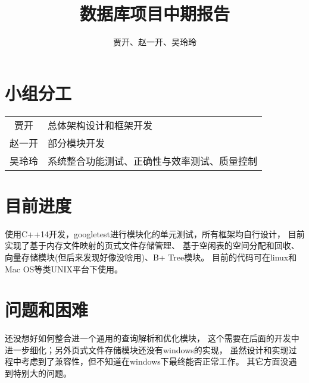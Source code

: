 \documentclass[a4paper]{article}
\title{数据库项目中期报告}
\author{贾开、赵一开、吴玲玲}
\date{}
\begin{document}
\maketitle
\section{小组分工}
\begin{tabular}{cl}
    贾开 & 总体架构设计和框架开发 \\
    赵一开 & 部分模块开发 \\
    吴玲玲 & 系统整合功能测试、正确性与效率测试、质量控制
\end{tabular}

\section{目前进度}
使用C++14开发，googletest进行模块化的单元测试，所有框架均自行设计，
目前实现了基于内存文件映射的页式文件存储管理、
基于空闲表的空间分配和回收、向量存储模块(但后来发现好像没啥用)、B+ Tree模块。
目前的代码可在linux和Mac OS等类UNIX平台下使用。

\section{问题和困难}
还没想好如何整合进一个通用的查询解析和优化模块，
这个需要在后面的开发中进一步细化；另外页式文件存储模块还没有windows的实现，
虽然设计和实现过程中考虑到了兼容性，但不知道在windows下最终能否正常工作。
其它方面没遇到特别大的问题。
\end{document}
